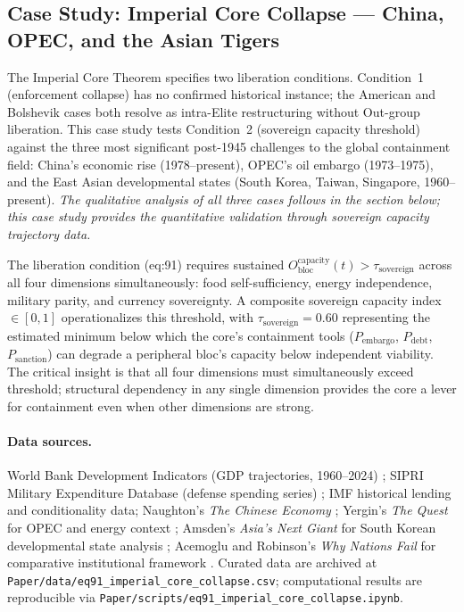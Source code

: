 \subsection*{Case Study: Imperial Core Collapse --- China, OPEC, and the Asian Tigers}

The Imperial Core Theorem specifies two liberation conditions. Condition~1 (enforcement collapse) has no confirmed historical instance; the American and Bolshevik cases both resolve as intra-Elite restructuring without Out-group liberation. This case study tests Condition~2 (sovereign capacity threshold) against the three most significant post-1945 challenges to the global containment field: China's economic rise (1978--present), OPEC's oil embargo (1973--1975), and the East Asian developmental states (South Korea, Taiwan, Singapore, 1960--present). \textit{The qualitative analysis of all three cases follows in the section below; this case study provides the quantitative validation through sovereign capacity trajectory data.}

The liberation condition (eq:91) requires sustained $O_{\text{bloc}}^{\text{capacity}}(t) > \tau_{\text{sovereign}}$ across all four dimensions simultaneously: food self-sufficiency, energy independence, military parity, and currency sovereignty. A composite sovereign capacity index $\in [0,1]$ operationalizes this threshold, with $\tau_{\text{sovereign}} = 0.60$ representing the estimated minimum below which the core's containment tools ($P_{\text{embargo}}$, $P_{\text{debt}}$, $P_{\text{sanction}}$) can degrade a peripheral bloc's capacity below independent viability. The critical insight is that all four dimensions must simultaneously exceed threshold; structural dependency in any single dimension provides the core a lever for containment even when other dimensions are strong.

\paragraph{Data sources.}
World Bank Development Indicators (GDP trajectories, 1960--2024) \cite{world_bank_wdi}; SIPRI Military Expenditure Database (defense spending series) \cite{sipri_milex}; IMF historical lending and conditionality data; Naughton's \textit{The Chinese Economy} \cite{naughton2007}; Yergin's \textit{The Quest} for OPEC and energy context \cite{yergin2011}; Amsden's \textit{Asia's Next Giant} for South Korean developmental state analysis \cite{amsden1989}; Acemoglu and Robinson's \textit{Why Nations Fail} for comparative institutional framework \cite{acemoglu_robinson}. Curated data are archived at \texttt{Paper/data/eq91\_imperial\_core\_collapse.csv}; computational results are reproducible via \texttt{Paper/scripts/eq91\_imperial\_core\_collapse.ipynb}.

